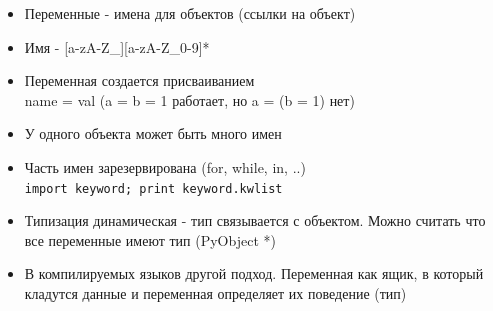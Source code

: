 \documentclass{article}
\begin{document}
\LARGE

\begin{itemize}
	\item Переменные - имена для объектов (ссылки на объект)
	\item Имя - [a-zA-Z\_][a-zA-Z\_0-9]*
	\item Переменная создается присваиванием \\ name = val (a = b = 1 работает, но a = (b = 1) нет)
	\item У одного объекта может быть много имен
	\item Часть имен зарезервирована (for, while, in, ..) \\
			\lstinline!import keyword; print keyword.kwlist!
	\item Типизация динамическая - тип связывается с объектом.
		  Можно считать что все переменные имеют тип (PyObject *)
	\item В компилируемых языков другой подход. Переменная как ящик, 
		  в который кладутся данные и переменная определяет их поведение (тип)
\end{itemize}
\newpage
\end{document}

